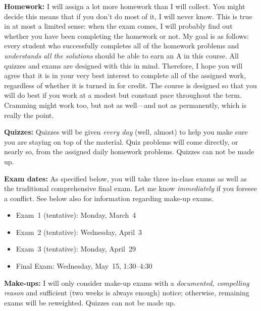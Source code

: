 \documentclass[11pt]{amsart}
\begin{document}
\textbf{Homework:} I will assign a lot more homework than I will collect. You might decide this means that if you don't do most of it, I will never know. This is true in at most a limited sense: when the exam comes, I will probably find out whether you have been completing the homework or not. My goal is as follows: every student who successfully completes all of the homework problems and \emph{understands all the solutions} should be able to earn an A in this course. All quizzes and exams are designed with this in mind. Therefore, I hope you will agree that it is in your very best interest to complete all of the assigned work, regardless of whether it is turned in for credit. The course is designed so that you will do best if you work at a modest but constant pace throughout the term. Cramming might work too, but not as well---and not as permanently, which is really the point.


\textbf{Quizzes:} Quizzes will be given \emph{every day} (well, almost) to help you make sure you are staying on top of the material. Quiz problems will come directly, or nearly so, from the assigned daily homework problems. Quizzes can not be made up.

\textbf{Exam dates:} As specified below, you will take three in-class exams as well as the traditional comprehensive final exam. Let me know \emph{immediately} if you foresee a conflict. See below also for information regarding make-up exams.
\begin{itemize}
   \item Exam~1 (tentative): Monday, March~4
   \item Exam~2 (tentative): Wednesday, April~3
   \item Exam~3 (tentative): Monday, April~29
   \item Final Exam: Wednesday, May~15, 1:30--4:30
\end{itemize}
%
\textbf{Make-ups:} I will only consider make-up exams with a \emph{documented, compelling reason} and sufficient (two weeks is always enough) notice; otherwise, remaining exams will be reweighted.  Quizzes can not be made up.
\end{document}
